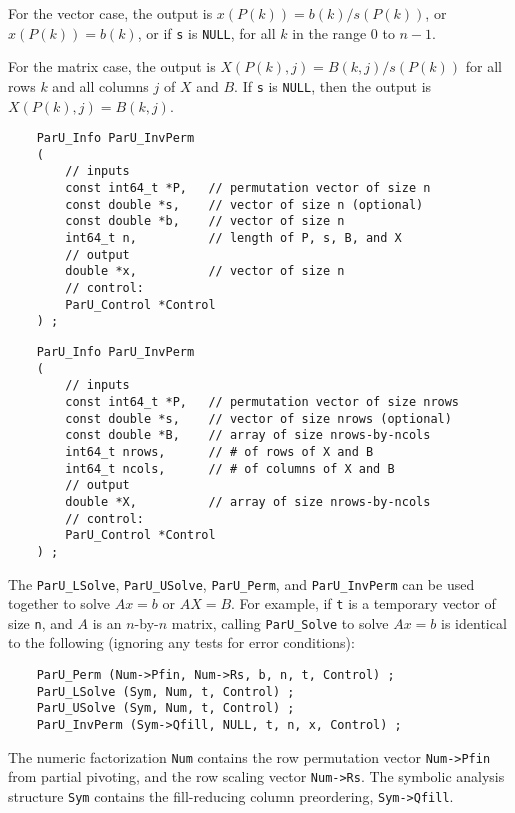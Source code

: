 \documentclass[12pt]{article}
\begin{document}
    For the vector case, the output is $x(P(k)) = b(k) / s(P(k))$, or
    $x(P(k)) = b(k)$, or if \verb's' is \verb'NULL', for all $k$ in the range 0
    to $n-1$.

    For the matrix case, the output is $X(P(k),j) = B(k,j) / s(P(k))$ for all
    rows $k$ and all columns $j$ of $X$ and $B$.  If \verb's' is \verb'NULL',
    then the output is $X(P(k),j) = B(k,j)$.

    {\footnotesize
    \begin{verbatim}
    ParU_Info ParU_InvPerm
    (
        // inputs
        const int64_t *P,   // permutation vector of size n
        const double *s,    // vector of size n (optional)
        const double *b,    // vector of size n
        int64_t n,          // length of P, s, B, and X
        // output
        double *x,          // vector of size n
        // control:
        ParU_Control *Control
    ) ; \end{verbatim} }

    {\footnotesize
    \begin{verbatim}
    ParU_Info ParU_InvPerm
    (
        // inputs
        const int64_t *P,   // permutation vector of size nrows
        const double *s,    // vector of size nrows (optional)
        const double *B,    // array of size nrows-by-ncols
        int64_t nrows,      // # of rows of X and B
        int64_t ncols,      // # of columns of X and B
        // output
        double *X,          // array of size nrows-by-ncols
        // control:
        ParU_Control *Control
    ) ; \end{verbatim} }

    The \verb'ParU_LSolve', \verb'ParU_USolve', \verb'ParU_Perm', and
    \verb'ParU_InvPerm' can be used together to solve $Ax=b$ or $AX=B$.  For
    example, if \verb't' is a temporary vector of size \verb'n', and $A$ is an
    $n$-by-$n$ matrix, calling \verb'ParU_Solve' to solve $Ax=b$ is identical
    to the following (ignoring any tests for error conditions):

    {\footnotesize
    \begin{verbatim}
    ParU_Perm (Num->Pfin, Num->Rs, b, n, t, Control) ;
    ParU_LSolve (Sym, Num, t, Control) ;
    ParU_USolve (Sym, Num, t, Control) ;
    ParU_InvPerm (Sym->Qfill, NULL, t, n, x, Control) ; \end{verbatim} }

    The numeric factorization \verb'Num' contains the row permutation vector
    \verb'Num->Pfin' from partial pivoting, and the row scaling vector
    \verb'Num->Rs'.  The symbolic analysis structure \verb'Sym' contains the
    fill-reducing column preordering, \verb'Sym->Qfill'.
\end{document}
